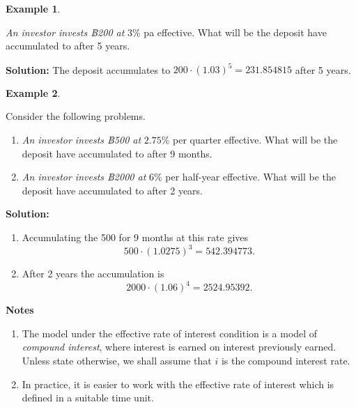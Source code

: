 \documentclass[landscape, 20pt]{extreport}
\theoremstyle{definition}
\theoremstyle{definition}
\newtheorem{example}{Example}[chapter]
\theoremstyle{definition}
\theoremstyle{definition}
\theoremstyle{remark}
\begin{document}
\newpage \begin{example}
\protect\hypertarget{exm:unlabeled-div-11}{}\label{exm:unlabeled-div-11}

\emph{An investor invests ฿200 at} \(3\)\% pa effective. What will be the
deposit have accumulated to after 5 years.

\end{example}

\textbf{Solution:} The deposit accumulates to
\(200 \cdot (1.03)^5 = 231.854815\) after 5 years.

\newpage \begin{example}
\protect\hypertarget{exm:unlabeled-div-12}{}\label{exm:unlabeled-div-12}

Consider the following problems.

\begin{enumerate}
\def\labelenumi{\arabic{enumi}.}
\item
  \emph{An investor invests ฿500 at} \(2.75\)\% per quarter effective. What
  will be the deposit have accumulated to after 9 months.
\item
  \emph{An investor invests ฿2000 at} \(6\)\% per half-year effective. What
  will be the deposit have accumulated to after 2 years.
\end{enumerate}

\end{example}

\textbf{Solution:}

\begin{enumerate}
\def\labelenumi{\arabic{enumi}.}
\item
  Accumulating the 500 for 9 months at this rate gives
  \[500 \cdot (1.0275)^3 = 542.394773.\]
\item
  After 2 years the accumulation is
  \[2000 \cdot (1.06)^4 = 2524.95392.\]
\end{enumerate}

\textbf{Notes}

\begin{enumerate}
\def\labelenumi{\arabic{enumi}.}
\item
  The model under the effective rate of interest condition is a
  model of \emph{compound interest}, where interest is earned on interest
  previously earned. Unless state otherwise, we shall assume that \(i\) is
  the compound interest rate.
\item
  In practice, it is easier to work with the effective rate of
  interest which is defined in a suitable time unit.
\end{enumerate}
\end{document}
